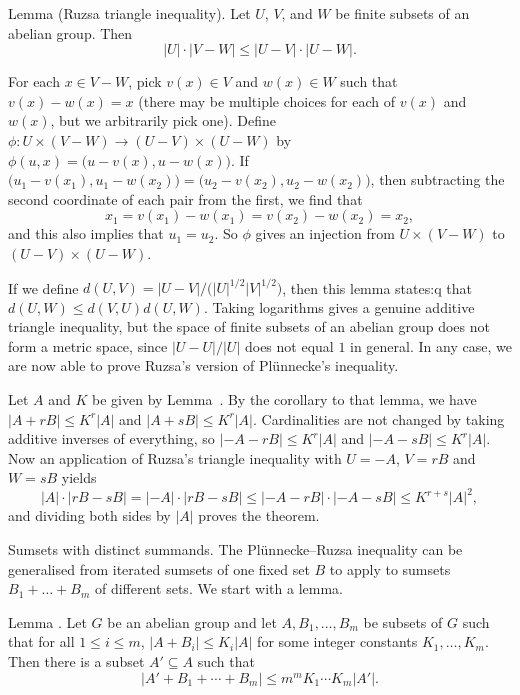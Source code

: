 \parenproclaim Lemma {\advthm} (Ruzsa triangle inequality). Let $U$, $V$, and $W$ be finite
subsets of an abelian group. Then
$$|U|\cdot |V-W| \le |U-V|\cdot |U-W|.$$

\proof For each $x\in V-W$, pick $v(x)\in V$ and $w(x)\in W$ such that $v(x)-w(x) = x$ (there may
be multiple choices for each of $v(x)$ and $w(x)$, but we arbitrarily pick one).
Define $\phi : U\times (V-W) \to (U-V)\times (U-W)$ by $\phi(u,x) = \bigl(u-v(x), u-w(x)\bigr)$.
If $\bigl(u_1 - v(x_1), u_1 - w(x_2)\bigr) = \bigl(u_2 - v(x_2), u_2 - w(x_2)\bigr)$, then
subtracting the second coordinate of each pair from the first, we find that
$$x_1 = v(x_1) - w(x_1) = v(x_2) - w(x_2) = x_2,$$
and this also implies that $u_1 = u_2$. So $\phi$ gives an injection from $U\times (V-W)$
to $(U-V)\times (U-W)$.\slug

If we define $d(U,V) = |U-V| / \bigl(|U|^{1/2}|V|^{1/2}\bigr)$, then this lemma states:q
that $d(U,W) \le d(V,U)d(U,W)$. Taking logarithms gives a genuine additive triangle inequality,
but the space of finite subsets of an abelian group does not form a metric space, since
$|U-U|/|U|$ does not equal $1$ in general. In any case, we are now able to prove Ruzsa's
version of Pl\"unnecke's inequality.

\medskip
{}\enspace Let $A$ and $K$ be given by
Lemma~{\lempetridis}. By the corollary to that lemma, we have $|A+rB| \le K^r|A|$ and
$|A+sB| \le K^r|A|$. Cardinalities are not changed by taking additive inverses of
everything, so $|{-A}-rB| \le K^r|A|$ and $|{-A}-sB|\le K^r|A|$. Now an application of Ruzsa's triangle
inequality with $U = -A$, $V = rB$ and $W = sB$ yields
$$|A|\cdot|rB-sB| = |{-A}|\cdot|rB-sB| \le |{-A}-rB|\cdot|{-A}-sB| \le K^{r+s}|A|^2,$$
and dividing both sides by $|A|$ proves the theorem.\slug

\medskip\boldlabel Sumsets with distinct summands.
The Pl\"unnecke--Ruzsa inequality can be generalised from iterated sumsets of one fixed set $B$
to apply to sumsets $B_1 + \ldots + B_m$ of different sets. We start with a lemma.

\proclaim Lemma \advthm. Let $G$ be an abelian group and let $A, B_1,\ldots, B_m$
be subsets of $G$ such that for all $1\le i\le m$, $|A+B_i|\le K_i|A|$ for some integer constants
$K_1,\ldots, K_m$. Then there is a subset $A'\subseteq A$ such that
$$|A' + B_1 + \cdots + B_m| \le m^m K_1\cdots K_m |A'|.$$


